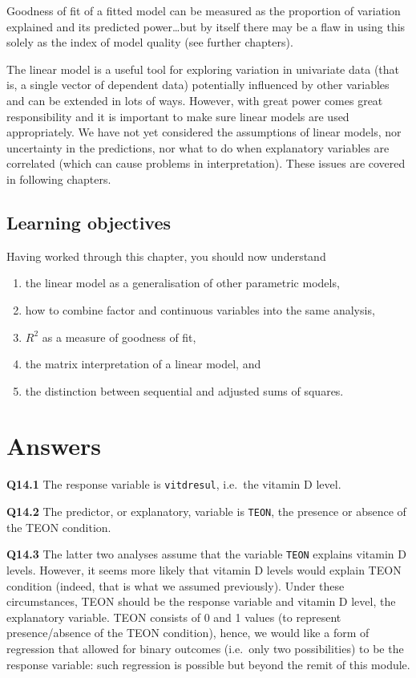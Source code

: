 \documentclass[
  oneside]{krantz}
\providecommand{\tightlist}{%
  \setlength{\itemsep}{0pt}\setlength{\parskip}{0pt}}
\begin{document}
Goodness of fit of a fitted model can be measured as the proportion of variation explained and its predicted power\ldots but by itself there may be a flaw in using this solely as the index of model quality (see further chapters).

The linear model is a useful tool for exploring variation in univariate data (that is, a single vector of dependent data) potentially influenced by other variables and can be extended in lots of ways. However, with great power comes great responsibility and it is important to make sure linear models are used appropriately. We have not yet considered the assumptions of linear models, nor uncertainty in the predictions, nor what to do when explanatory variables are correlated (which can cause problems in interpretation). These issues are covered in following chapters.

\hypertarget{learning-objectives-2}{%
\subsection{Learning objectives}\label{learning-objectives-2}}

Having worked through this chapter, you should now understand

\begin{enumerate}
\def\labelenumi{\arabic{enumi}.}
\tightlist
\item
  the linear model as a generalisation of other parametric models,
\item
  how to combine factor and continuous variables into the same analysis,
\item
  \(R^2\) as a measure of goodness of fit,
\item
  the matrix interpretation of a linear model, and
\item
  the distinction between sequential and adjusted sums of squares.
\end{enumerate}

\hypertarget{ANSlm}{%
\section{Answers}\label{ANSlm}}

\textbf{Q14.1} The response variable is \texttt{vitdresul}, i.e.~the vitamin D level.

\textbf{Q14.2} The predictor, or explanatory, variable is \texttt{TEON}, the presence or absence of the TEON condition.

\textbf{Q14.3} The latter two analyses assume that the variable \texttt{TEON} explains vitamin D levels. However, it seems more likely that vitamin D levels would explain TEON condition (indeed, that is what we assumed previously). Under these circumstances, TEON should be the response variable and vitamin D level, the explanatory variable. TEON consists of 0 and 1 values (to represent presence/absence of the TEON condition), hence, we would like a form of regression that allowed for binary outcomes (i.e.~only two possibilities) to be the response variable: such regression is possible but beyond the remit of this module.
\end{document}
